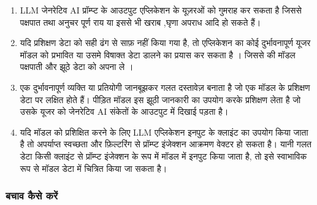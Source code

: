 \documentclass[
]{article}
\providecommand{\tightlist}{%
  \setlength{\itemsep}{0pt}\setlength{\parskip}{0pt}}
\begin{document}
\begin{enumerate}
\def\labelenumi{\arabic{enumi}.}
\tightlist
\item
  LLM जेनरेटिव AI प्रॉम्प्ट के आउटपुट एप्लिकेशन के यूज़रओं को गुमराह कर सकता है जिससे
  पक्षपात तथा अनुचर पूर्ण राय या इससे भी खराब ,घृणा अपराध आदि हो सकते हैं।
\item
  यदि प्रशिक्षण डेटा को सही ढंग से साफ़ नहीं किया गया है, तो एप्लिकेशन का कोई
  दुर्भावनापूर्ण यूजर मॉडल को प्रभावित या उसमे विषाक्त डेटा डालने का प्रयास कर सकता
  है । जिससे की मॉडल पक्षपाती और झूठे डेटा को अपना ले ।
\item
  एक दुर्भावनापूर्ण व्यक्ति या प्रतियोगी जानबूझकर गलत दस्तावेज़ बनाता है जो एक मॉडल
  के प्रशिक्षण डेटा पर लक्षित होते हैं। पीड़ित मॉडल इस झूठी जानकारी का उपयोग करके
  प्रशिक्षण लेता है जो उसके यूजर को जेनरेटिव AI संकेतों के आउटपुट में दिखाई पड़ता है।
\item
  यदि मॉडल को प्रशिक्षित करने के लिए LLM एप्लिकेशन इनपुट के क्लाइंट का उपयोग किया
  जाता है तो अपर्याप्त स्वच्छता और फ़िल्टरिंग से प्रॉम्प्ट इंजेक्शन आक्रमण वेक्टर हो सकता
  है। यानी गलत डेटा किसी क्लाइंट से प्रॉम्प्ट इंजेक्शन के रूप में मॉडल में इनपुट किया जाता
  है, तो इसे स्वाभाविक रूप से मॉडल डेटा में चित्रित किया जा सकता है।
\end{enumerate}

\subsubsection{बचाव कैसे करें}\label{ux92cux91aux935-ux915ux938-ux915ux930}
\end{document}
